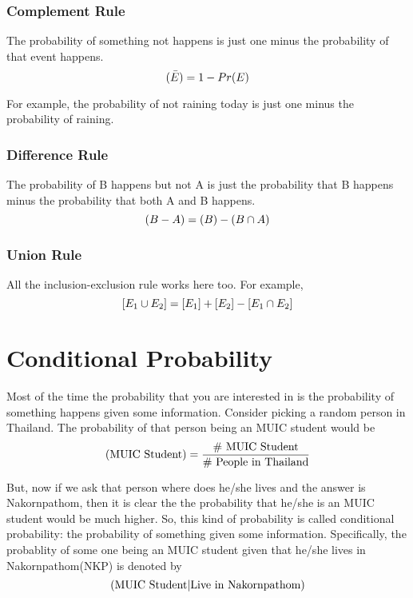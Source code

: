 \documentclass[a4paper, 12pt]{article}
\let\Pr\relax
\DeclareMathOperator{\Pr}{Pr}
\begin{document}
\begin{multicols}{2}
\subsubsection*{Complement Rule}
The probability of something not happens is just one minus the probability of that event happens.
\[
	\Pr(\bar{E}) = 1 - Pr(E)
\]

For example, the probability of not raining today is just one minus the probability of raining.

\subsubsection*{Difference Rule}
The probability of B happens but not A is just the probability that B happens minus the probability that both A and B happens.
\[
	\Pr(B-A) = \Pr(B) - \Pr(B \cap A)
\]

\begin{center}	
\end{center}

\subsubsection*{Union Rule}
All the inclusion-exclusion rule works here too. For example,
\[
	\Pr\left[E_1 \cup E_2\right] = \Pr[E_1] +  \Pr[E_2] - \Pr[E_1 \cap E_2]
\]

\section*{Conditional Probability}

Most of the time the probability that you are interested in is the probability of something happens given some information. Consider picking a random person in Thailand. The probability of that person being an MUIC student would be
\[
	\Pr(\text{MUIC Student}) = \frac{\text{\# MUIC Student}}{\text{\# People in Thailand}}
\]

But, now if we ask that person where does he/she lives and the answer is Nakornpathom, then it is clear the the probability that he/she is an MUIC student would be much higher. So, this kind of probability is called conditional probability: the probability of something given some information. Specifically, the probablity of some one being an MUIC student given that he/she lives in Nakornpathom(NKP) is denoted by
\[
	\Pr(\text{MUIC Student} | \text{Live in Nakornpathom})
\]


\end{multicols}
\end{document}
